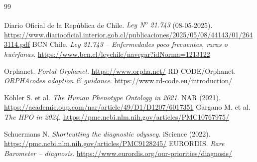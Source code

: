 \documentclass{article}
\begin{document}
\begin{thebibliography}{99}

 Diario Oficial de la República de Chile. \textit{Ley N\textsuperscript{o} 21.743} (08-05-2025). \url{https://www.diariooficial.interior.gob.cl/publicaciones/2025/05/08/44143/01/2643114.pdf}
 BCN Chile. \textit{Ley 21.743 – Enfermedades poco frecuentes, raras o huérfanas}. \url{https://www.bcn.cl/leychile/navegar?idNorma=1213122}

 Orphanet. \textit{Portal Orphanet}. \url{https://www.orpha.net/}
 RD-CODE/Orphanet. \textit{ORPHAcodes adoption \& guidance}. \url{https://www.rd-code.eu/introduction/}

 Köhler S. et al. \textit{The Human Phenotype Ontology in 2021}. NAR (2021). \url{https://academic.oup.com/nar/article/49/D1/D1207/6017351}
 Gargano M. et al. \textit{The HPO in 2024}. \url{https://pmc.ncbi.nlm.nih.gov/articles/PMC10767975/}

 Schuermans N. \textit{Shortcutting the diagnostic odyssey}. iScience (2022). \url{https://pmc.ncbi.nlm.nih.gov/articles/PMC9128245/}
 EURORDIS. \textit{Rare Barometer – diagnosis}. \url{https://www.eurordis.org/our-priorities/diagnosis/}

\end{thebibliography}
\end{document}
